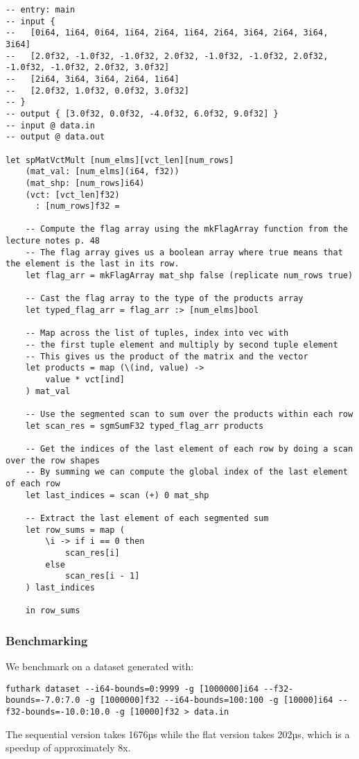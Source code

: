\documentclass{article}
\begin{document}
\begin{lstlisting}[language=futhark]
-- entry: main
-- input {
--   [0i64, 1i64, 0i64, 1i64, 2i64, 1i64, 2i64, 3i64, 2i64, 3i64, 3i64]
--   [2.0f32, -1.0f32, -1.0f32, 2.0f32, -1.0f32, -1.0f32, 2.0f32, -1.0f32, -1.0f32, 2.0f32, 3.0f32]
--   [2i64, 3i64, 3i64, 2i64, 1i64]
--   [2.0f32, 1.0f32, 0.0f32, 3.0f32]
-- }
-- output { [3.0f32, 0.0f32, -4.0f32, 6.0f32, 9.0f32] }
-- input @ data.in
-- output @ data.out

let spMatVctMult [num_elms][vct_len][num_rows]
    (mat_val: [num_elms](i64, f32))
    (mat_shp: [num_rows]i64)
    (vct: [vct_len]f32)
      : [num_rows]f32 =

    -- Compute the flag array using the mkFlagArray function from the lecture notes p. 48
    -- The flag array gives us a boolean array where true means that the element is the last in its row.
    let flag_arr = mkFlagArray mat_shp false (replicate num_rows true) 

    -- Cast the flag array to the type of the products array
    let typed_flag_arr = flag_arr :> [num_elms]bool

    -- Map across the list of tuples, index into vec with 
    -- the first tuple element and multiply by second tuple element
    -- This gives us the product of the matrix and the vector
    let products = map (\(ind, value) -> 
        value * vct[ind]
    ) mat_val

    -- Use the segmented scan to sum over the products within each row
    let scan_res = sgmSumF32 typed_flag_arr products

    -- Get the indices of the last element of each row by doing a scan over the row shapes
    -- By summing we can compute the global index of the last element of each row
    let last_indices = scan (+) 0 mat_shp

    -- Extract the last element of each segmented sum
    let row_sums = map (
        \i -> if i == 0 then 
            scan_res[i]
        else 
            scan_res[i - 1]
    ) last_indices

    in row_sums
\end{lstlisting}

\subsubsection{Benchmarking}

We benchmark on a dataset generated with:

\begin{verbatim}
futhark dataset --i64-bounds=0:9999 -g [1000000]i64 --f32-bounds=-7.0:7.0 -g [1000000]f32 --i64-bounds=100:100 -g [10000]i64 --f32-bounds=-10.0:10.0 -g [10000]f32 > data.in
\end{verbatim}

The sequential version takes 1676µs while the flat version takes 202µs, which is a speedup of approximately 8x.
\end{document}
